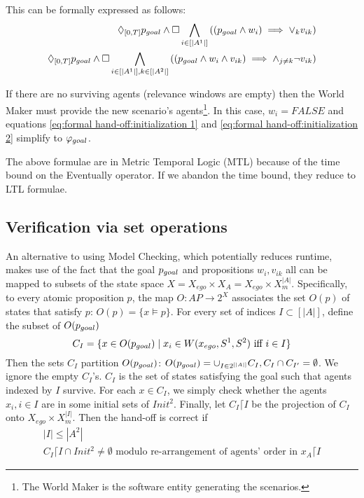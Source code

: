 This can be formally expressed as follows:
\begin{eqnarray}
\label{eq:formal hand-off:initialization}
\Diamond_{[0,T]} p_{goal} \wedge \square \bigwedge_{i \in [|A^1|]} \left( (p_{goal} \wedge  w_i) \implies \vee_{k} v_{ik} \right)
\label{eq:formal hand-off:initialization 1}
\\
\Diamond_{[0,T]} p_{goal} \wedge \square \bigwedge_{i \in [|A^1|], k \in [|A^2|]} \left( (p_{goal} \wedge  w_i \wedge v_{ik}) \implies \wedge_{j \neq k} \neg v_{ik} \right)
\label{eq:formal hand-off:initialization 2}
\end{eqnarray}

If there are no surviving agents (relevance windows are empty) then the World Maker must provide the new scenario's agents\footnote{The World Maker is the software entity generating the scenarios.}.
In this case,  $w_i = FALSE$ and equations \eqref{eq:formal hand-off:initialization 1} and \eqref{eq:formal hand-off:initialization 2} simplify to $\varphi_{goal}$.

The above formulae are in Metric Temporal Logic (MTL) because of the time bound on the Eventually operator. 
If we abandon the time bound, they reduce to LTL formulae.

\subsection{Verification via set operations}
An alternative to using Model Checking, which potentially reduces runtime, makes use of the fact that the goal $p_{goal}$ and propositions $w_i, v_{ik}$ all can be mapped to subsets of the state space $X = X_{ego} \times X_A = X_{ego} \times X_m^{|A|}$.
Specifically, to every atomic proposition $p$, the map $O:AP \rightarrow 2^X$ associates the set $O(p)$ of states that satisfy $p$: $O(p) = \{x \models p\}$.
For every set of indices $I \subset [|A|]$, define the subset of $O(p_{goal})$
\[C_I = \{x \in O(p_{goal}) \;|\; x_i \in W(x_{ego},S^1,S^2) \textrm{ iff } i \in I\}\]
Then the sets $C_I$ partition $O(p_{goal})$: $O(p_{goal}) = \cup_{I \in 2^{[|A|]}}C_I, C_I \cap C_{I'} = \emptyset$.
We ignore the empty $C_I$'s.
$C_I$ is the set of states satisfying the goal such that agents indexed by $I$ survive. 
For each $x \in C_I$, we simply check whether the agents $x_i,i\in I$ are in some initial sets of $Init^2$.
Finally, let $C_I\lceil I$ be the projection of $C_I$ onto $X_{ego} \times X_m^{|I|}$.
Then the hand-off is correct if
\begin{eqnarray}
|I| \leq |A^2| 
\\
C_I \lceil I \cap Init^2 \neq \emptyset \textrm{ modulo re-arrangement of agents' order in }x_A\lceil I
\end{eqnarray}

